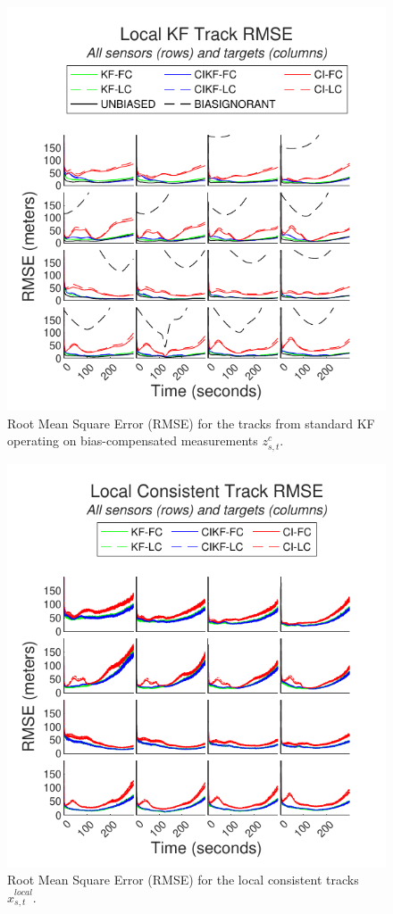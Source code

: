 \documentclass[journal]{IEEEtran}
\begin{document}
\begin{figure}[ht]
    \centering
    \includegraphics[scale=0.85]{kftrack_rmse.pdf}
    \caption{Root Mean Square Error (RMSE) for the tracks from standard KF operating on bias-compensated measurements $z_{s,t}^c$.}
    \label{fig:resultskftrackrmse}
\end{figure}

\begin{figure}[ht]
    \centering
    \includegraphics[scale=0.85]{localtrack_rmse.pdf}
    \caption{Root Mean Square Error (RMSE) for the local consistent tracks $\hat{x}_{s,t}^{local}$.}
    \label{fig:resultslocaltrackrmse}
\end{figure}
\end{document}
